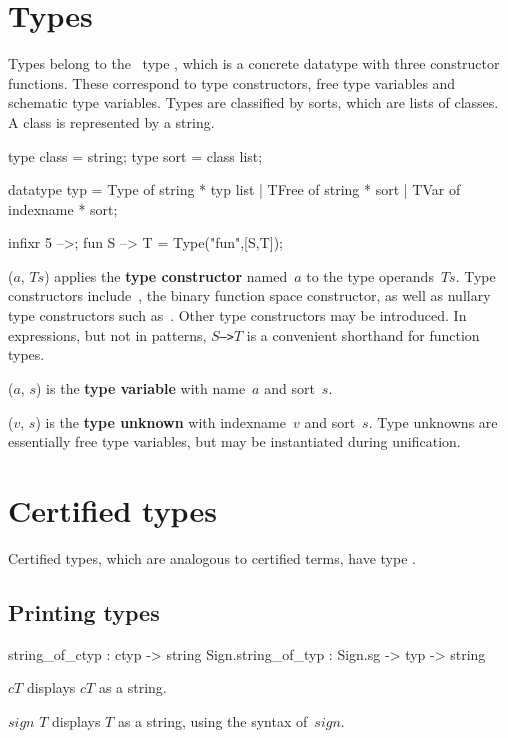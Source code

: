 \section{Types} 
Types belong to the \ML\ type , which is a concrete
datatype with three constructor functions.  These correspond to type
constructors, free type variables and schematic type variables.  Types are
classified by sorts, which are lists of classes.  A class is represented by
a string.
\begin{ttbox}
type class = string;
type sort  = class list;

datatype typ = Type  of string * typ list
             | TFree of string * sort
             | TVar  of indexname * sort;

infixr 5 -->;
fun S --> T = Type("fun",[S,T]);
\end{ttbox}
\begin{ttdescription}
\item[\ttindexbold{Type}($a$, $Ts$)] 
  applies the {\bf type constructor} named~$a$ to the type operands~$Ts$.
  Type constructors include~, the binary function space
  constructor, as well as nullary type constructors such as~.
  Other type constructors may be introduced.  In expressions, but not in
  patterns, \hbox{\tt$S$-->$T$} is a convenient shorthand for function
  types.

\item[\ttindexbold{TFree}($a$, $s$)] 
  is the {\bf type variable} with name~$a$ and sort~$s$.

\item[\ttindexbold{TVar}($v$, $s$)] 
  is the {\bf type unknown} with indexname~$v$ and sort~$s$.
  Type unknowns are essentially free type variables, but may be
  instantiated during unification.
\end{ttdescription}


\section{Certified types}
Certified types, which are analogous to certified terms, have type 
.

\subsection{Printing types}
\begin{ttbox} 
     string_of_ctyp :           ctyp -> string
Sign.string_of_typ  : Sign.sg -> typ -> string
\end{ttbox}
\begin{ttdescription}
\item[\ttindexbold{string_of_ctyp} $cT$] 
displays $cT$ as a string.

\item[\ttindexbold{Sign.string_of_typ} $sign$ $T$] 
displays $T$ as a string, using the syntax of~$sign$.
\end{ttdescription}


